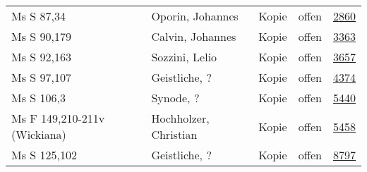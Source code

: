 \documentclass[10pt,a4paper,landscape]{report}
\begin{document}
\begin{longtable}{p{16cm}p{4cm}llr}
Ms S 87,34	&	Oporin, Johannes	&	Kopie	&	offen	&	\href{http://130.60.24.72/assignment/2860}{2860}\\
Ms S 90,179	&	Calvin, Johannes	&	Kopie	&	offen	&	\href{http://130.60.24.72/assignment/3363}{3363}\\
Ms S 92,163	&	Sozzini, Lelio	&	Kopie	&	offen	&	\href{http://130.60.24.72/assignment/3657}{3657}\\
Ms S 97,107	&	Geistliche, ?	&	Kopie	&	offen	&	\href{http://130.60.24.72/assignment/4374}{4374}\\
Ms S 106,3	&	Synode, ?	&	Kopie	&	offen	&	\href{http://130.60.24.72/assignment/5440}{5440}\\
Ms F 149,210-211v (Wickiana)	&	Hochholzer, Christian	&	Kopie	&	offen	&	\href{http://130.60.24.72/assignment/5458}{5458}\\
Ms S 125,102	&	Geistliche, ?	&	Kopie	&	offen	&	\href{http://130.60.24.72/assignment/8797}{8797}\\
\bottomrule
\end{longtable}
\end{document}
